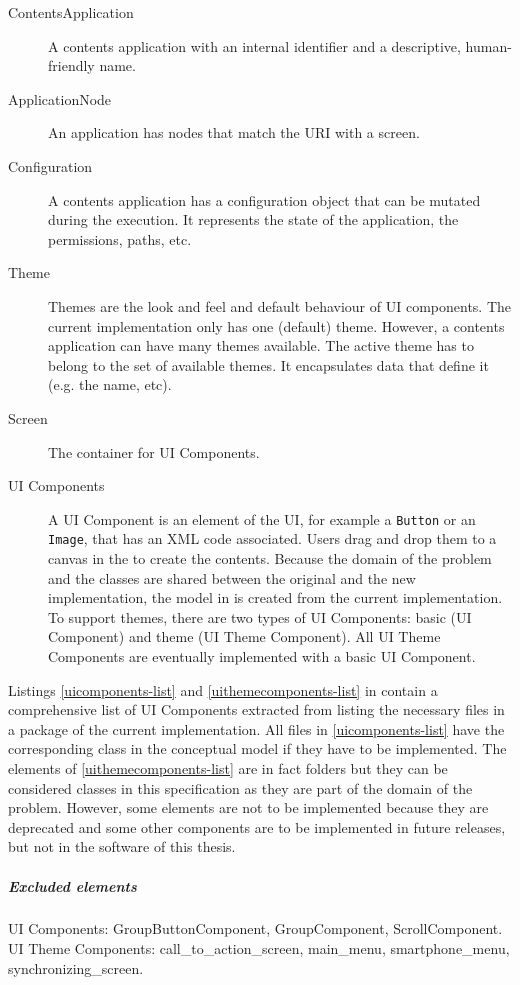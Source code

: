 \begin{description}
\item[ContentsApplication] A contents application with an internal identifier and a descriptive, human-friendly name.
\item[ApplicationNode] An application has nodes that match the \ac{URI} with a screen.
\item[Configuration] A contents application has a configuration object that can be mutated during the execution.
It represents the state of the application, the permissions, paths, etc.
\item[Theme] Themes are the look and feel and default behaviour of \ac{UI} components.
The current implementation only has one (default) theme.
However, a contents application can have many themes available.
The active theme has to belong to the set of available themes. 
It encapsulates data that define it (e.g. the name, etc).
\item[Screen] The container for UI Components.
\item[UI Components] A UI Component is an element of the \ac{UI}, for example a \texttt{Button} or an \texttt{Image}, that has an \ac{XML} code associated.
Users drag and drop them to a canvas in the \se to create the contents. 
Because the domain of the problem and the classes are shared between the original and the new implementation, the model in  is created from the current implementation.
To support themes, there are two types of UI Components: basic (UI Component) and theme (UI Theme Component).
All UI Theme Components are eventually implemented with a basic UI Component.
\end{description}

Listings \ref{uicomponents-list} and \ref{uithemecomponents-list} in  contain a comprehensive list of UI Components extracted from listing the necessary files in a package of the current implementation.
All files in \ref{uicomponents-list} have the corresponding class in the conceptual model if they have to be implemented.
The elements of \ref{uithemecomponents-list} are in fact folders but they can be considered classes in this specification as they are part of the domain of the problem.
However, some elements are not to be implemented because they are deprecated and some other components are to be implemented in future releases, but not in the software of this thesis.

\subparagraph{Excluded elements} UI Components: GroupButtonComponent, GroupComponent, ScrollComponent. UI Theme Components: call\_to\_action\_screen, main\_menu, smartphone\_menu, synchronizing\_screen.

